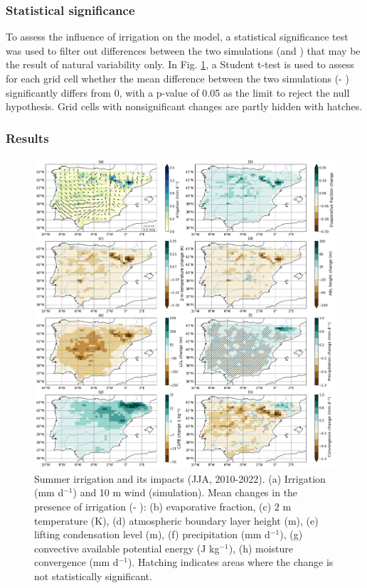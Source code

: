 \subsubsection{Statistical significance}
To assess the influence of irrigation on the model, a statistical significance test was used to filter out differences between the two simulations (\irr and \noirr) that may be the result of natural variability only. In Fig. \ref{fig:diff_sig_6vars}, a Student t-test is used to assess for each grid cell whether the mean difference between the two simulations  (\irr - \noirr) significantly differs from 0, with a p-value of 0.05 as the limit to reject the null hypothesis. Grid cells with nonsignificant changes are partly hidden with hatches.

\subsubsection{Results}
\begin{figure}[htbp]
    \centering
    \includegraphics[width=15cm]{images/chap4/article/f07.png}
    \caption{Summer irrigation and its impacts (JJA, 2010-2022). (a) Irrigation (mm d$^{-1}$) and 10 m wind (\irr simulation). Mean changes in the presence of irrigation (\irr - \noirr): (b) evaporative fraction, (c) 2 m temperature (K), (d) atmospheric boundary layer height (m), (e) lifting condensation level (m), (f) precipitation (mm d$^{-1}$), (g) convective available potential energy (J kg$^{-1}$), (h) moisture convergence (mm d$^{-1}$). Hatching indicates areas where the change is not statistically significant.}
    \label{fig:diff_sig_6vars}
\end{figure}

